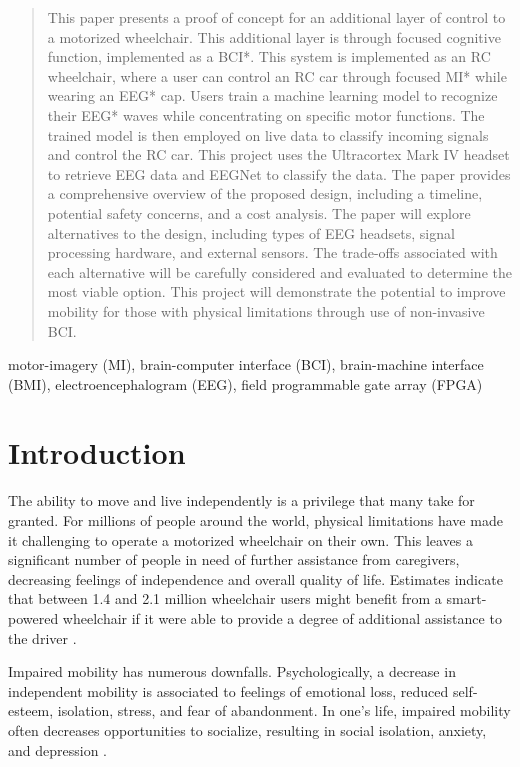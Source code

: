 \documentclass[conference]{IEEEtran}
\begin{document}
\begin{abstract}
This paper presents a proof of concept for an additional layer of control to a motorized wheelchair. This additional layer is through focused cognitive function, implemented as a BCI*. This system is implemented as an RC wheelchair, where a user can control an RC car through focused MI* while wearing an EEG* cap. Users train a machine learning model to recognize their EEG* waves while concentrating on specific motor functions. The trained model is then employed on live data to classify incoming signals and control the RC car. This project uses the Ultracortex Mark IV headset to retrieve EEG data and EEGNet to classify the data. The paper provides a comprehensive overview of the proposed design, including a timeline, potential safety concerns, and a cost analysis. The paper will explore alternatives to the design, including types of EEG headsets, signal processing hardware, and external sensors. The trade-offs associated with each alternative will be carefully considered and evaluated to determine the most viable option. This project will demonstrate the potential to improve mobility for those with physical limitations through use of non-invasive BCI. 
\end{abstract}

\begin{IEEEkeywords}
motor-imagery (MI), brain-computer interface (BCI), brain-machine interface (BMI), electroencephalogram (EEG), field programmable gate array (FPGA)
\end{IEEEkeywords}
\renewcommand{\thesubsection}{\Roman{section}.\Alph{subsection}}
\section{Introduction}
    The ability to move and live independently is a privilege that many take for granted. For millions of people around the world, physical limitations have made it challenging to operate a motorized wheelchair on their own. This leaves a significant number of people in need of further assistance from caregivers, decreasing feelings of independence and overall quality of life. Estimates indicate that between 1.4 and 2.1 million wheelchair users might benefit from a smart-powered wheelchair if it were able to provide a degree of additional assistance to the driver \cite{smart_wheelchairs}.  
    
    Impaired mobility has numerous downfalls. Psychologically, a decrease in independent mobility is associated to feelings of emotional loss, reduced self-esteem, isolation, stress, and fear of abandonment. In one's life, impaired mobility often decreases opportunities to socialize, resulting in social isolation, anxiety, and depression \cite{how_many_people}.
    
\end{document}
